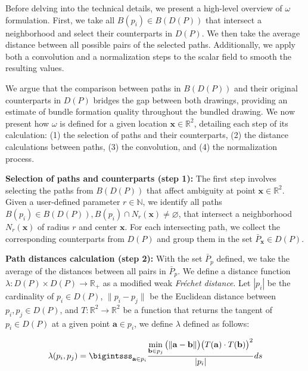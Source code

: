 Before delving into the technical details, we present a high-level overview of $\omega$ formulation. First, we take all $B(p_i) \in B(D(P))$ that intersect a neighborhood and select their counterparts in $D(P)$. We then take the average distance between all possible pairs of the selected paths. Additionally, we apply both a convolution and a normalization steps to the scalar field to smooth the resulting values. 

We argue that the comparison between paths in $B(D(P))$ and their original counterparts in $D(P)$ bridges the gap between both drawings, providing an estimate of bundle formation quality throughout the bundled drawing. We now present how $\omega$ is defined for a given location $\mathbf{x} \in \mathbb{R}^2$, detailing each step of its calculation: (1) the selection of paths and their counterparts, (2) the distance calculations between paths, (3) the convolution, and (4) the normalization process.


\textbf{Selection of paths and counterparts (step 1):}
The first step involves selecting the paths from $B(D(P))$ that affect ambiguity at point $\mathbf{x} \in \mathbb{R}^2$. Given a user-defined parameter $r \in \mathbb{N}$, we identify all paths $B(p_i) \in B(D(P)), B(p_i) \cap N_r(\mathbf{x}) \neq \varnothing$, that intersect a neighborhood $N_r(\mathbf{x})$ of radius $r$ and center $\mathbf{x}$. For each intersecting path, we collect the corresponding counterparts from $D(P)$ and group them in the set $\bar{P}_{\mathbf{x}} \in D(P)$.


\textbf{Path distances calculation (step 2):}
With the set $\bar{P}_p$ defined, we take the average of the distances between all pairs in $\bar{P}_p$. We define a distance function $\lambda : D(P) \times D(P) \rightarrow \mathbb{R}_{+}$ as a modified weak \emph{Fr\'echet distance}. Let $| p_i |$ be the cardinality of $p_i \in D(P)$, $\| p_i - p_j \|$ be the Euclidean distance between $p_i, p_j \in D(P)$, and $T : \mathbb{R}^2 \rightarrow \mathbb{R}^2$ be a function that returns the tangent of $p_i \in D(P)$ at a given point $\mathbf{a} \in p_i$, we define $\lambda$ defined as follows:

\begin{equation}
\lambda(p_i, p_j) =
\bigintsss_{\mathbf{a} \in p_i} \frac
{\displaystyle \min_{\mathbf{b} \in p_j} \big(\| \mathbf{a} - \mathbf{b} \|\big) \big(T(\mathbf{a}) \cdot T(\mathbf{b})\big)^2}
{|p_i|}
ds
\end{equation}

